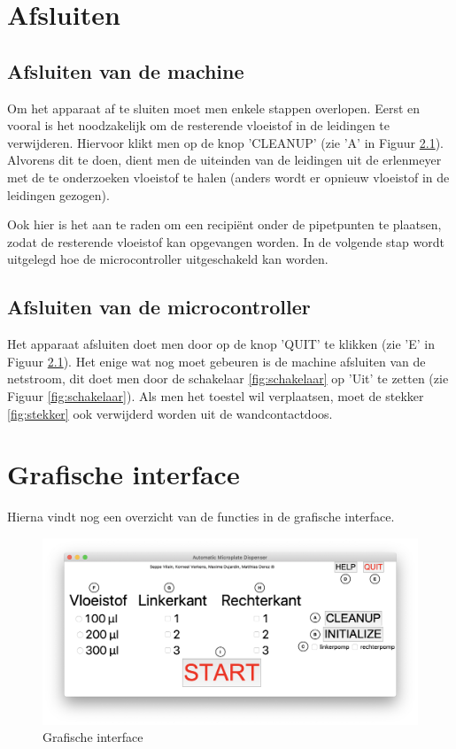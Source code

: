 \documentclass[a4paper,twoside,kulak]{kulakreport} %
\begin{document}
\chapter{Afsluiten}

\section{Afsluiten van de machine}
\label{sec:cleanup}

Om het apparaat af te sluiten moet men enkele stappen overlopen. Eerst en vooral is het noodzakelijk om de resterende vloeistof in de leidingen te verwijderen. Hiervoor klikt men op de knop 'CLEANUP' (zie 'A' in Figuur \ref{fig:GI_letters}). Alvorens dit te doen, dient men de uiteinden van de leidingen uit de erlenmeyer met de te onderzoeken vloeistof te halen (anders wordt er opnieuw vloeistof in de leidingen gezogen).


 Ook hier is het aan te raden om een recipiënt onder de pipetpunten te plaatsen, zodat de resterende vloeistof kan opgevangen worden. In de volgende stap wordt uitgelegd hoe de microcontroller uitgeschakeld kan worden.
 
 
\section{Afsluiten van de microcontroller }
 
Het apparaat afsluiten doet men door op de knop 'QUIT' te klikken (zie 'E' in Figuur \ref{fig:GI_letters}). Het enige wat nog moet gebeuren is de machine afsluiten van de netstroom, dit doet men door de schakelaar \ref{fig:schakelaar} op 'Uit' te zetten (zie Figuur \ref{fig:schakelaar}). Als men het toestel wil verplaatsen, moet de stekker \ref{fig:stekker} ook verwijderd worden uit de wandcontactdoos. 

\chapter{Grafische interface}

Hierna vindt nog een overzicht van de functies in de grafische interface. 

\begin{figure}[h]
	\centering
	\includegraphics[width=1.2\textwidth]{GI_letters}
	\caption{Grafische interface}
	\label{fig:GI_letters}
\end{figure}
\end{document}
